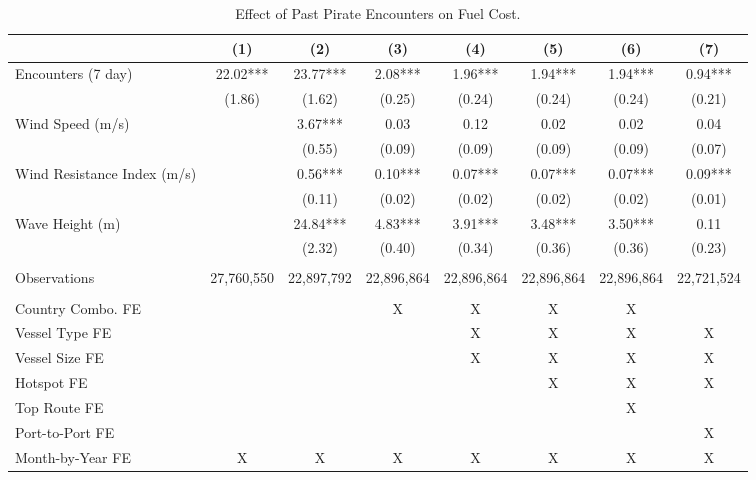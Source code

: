 \begin{table}
\centering
\caption{Effect of Past Pirate Encounters on Fuel Cost. \label{tab:spec-fuel-table-rev}}
\centering
\begin{adjustbox}{width = .9\textwidth}
\begin{threeparttable}
\begin{tabular}[t]{lccccccc}
\toprule
  & (1) & (2) & (3) & (4) & (5) & (6) & (7)\\
\midrule
Encounters (7 day) & \num{22.02}*** & \num{23.77}*** & \num{2.08}*** & \num{1.96}*** & \num{1.94}*** & \num{1.94}*** & \num{0.94}***\\
 & (\num{1.86}) & (\num{1.62}) & (\num{0.25}) & (\num{0.24}) & (\num{0.24}) & (\num{0.24}) & (\num{0.21})\\
Wind Speed (m/s) &  & \num{3.67}*** & \num{0.03} & \num{0.12} & \num{0.02} & \num{0.02} & \num{0.04}\\
 &  & (\num{0.55}) & (\num{0.09}) & (\num{0.09}) & (\num{0.09}) & (\num{0.09}) & (\num{0.07})\\
Wind Resistance Index (m/s) &  & \num{0.56}*** & \num{0.10}*** & \num{0.07}*** & \num{0.07}*** & \num{0.07}*** & \num{0.09}***\\
 &  & (\num{0.11}) & (\num{0.02}) & (\num{0.02}) & (\num{0.02}) & (\num{0.02}) & (\num{0.01})\\
Wave Height (m) &  & \num{24.84}*** & \num{4.83}*** & \num{3.91}*** & \num{3.48}*** & \num{3.50}*** & \num{0.11}\\
 &  & (\num{2.32}) & (\num{0.40}) & (\num{0.34}) & (\num{0.36}) & (\num{0.36}) & (\num{0.23})\\
 &  &  &  &  &  &  & \\
Observations & 27,760,550 & 22,897,792 & 22,896,864 & 22,896,864 & 22,896,864 & 22,896,864 & 22,721,524\\
 &  &  &  &  &  &  & \\
Country Combo. FE &  &  & X & X & X & X & \\
Vessel Type FE &  &  &  & X & X & X & X\\
Vessel Size FE &  &  &  & X & X & X & X\\
Hotspot FE &  &  &  &  & X & X & X\\
Top Route FE &  &  &  &  &  & X & \\
Port-to-Port FE &  &  &  &  &  &  & X\\
Month-by-Year FE & X & X & X & X & X & X & X\\
\bottomrule
\end{tabular}
\begin{tablenotes}

\end{tablenotes}
\end{threeparttable}
\end{adjustbox}
\end{table}

